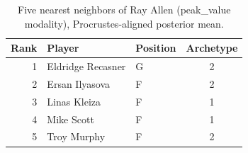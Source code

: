 \begin{table}[htbp]
  \centering\small
  \begin{tabular}{rllc}
    \toprule
    Rank & Player & Position & Archetype \\
    \midrule
    1 & Eldridge Recasner & G & 2 \\
    2 & Ersan Ilyasova & F & 2 \\
    3 & Linas Kleiza & F & 1 \\
    4 & Mike Scott & F & 1 \\
    5 & Troy Murphy & F & 2 \\
    \bottomrule
  \end{tabular}
  \caption{Five nearest neighbors of Ray Allen (peak_value modality), Procrustes-aligned posterior mean.}
  \label{tab:Ray_Allen_neighbors_peak_value}
\end{table}

